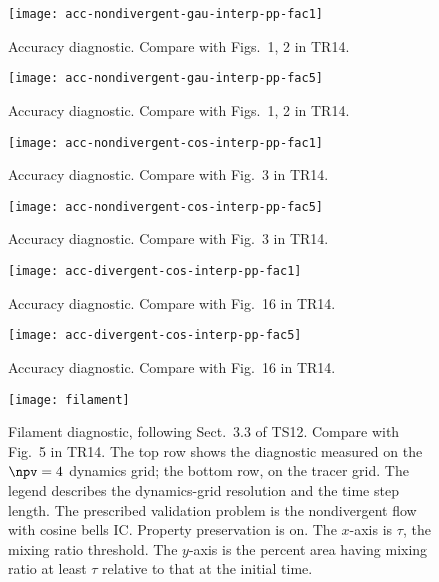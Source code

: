 \begin{figure}[tbh]
  \centering
  \texttt{[image: acc-nondivergent-gau-interp-pp-fac1]}
  \caption{
    Accuracy diagnostic.
    Compare with Figs.~1, 2 in TR14.
  }
  \label{fig:islet-acc-nondiv-gau-a}
\end{figure}
\begin{figure}[tbh]
  \centering
  \texttt{[image: acc-nondivergent-gau-interp-pp-fac5]}
  \caption{
    Accuracy diagnostic.
    Compare with Figs.~1, 2 in TR14.
  }
  \label{fig:islet-acc-nondiv-gau-b}
\end{figure}
\begin{figure}[tbh]
  \centering
  \texttt{[image: acc-nondivergent-cos-interp-pp-fac1]}
  \caption{
    Accuracy diagnostic.
    Compare with Fig.~3 in TR14.
  }
  \label{fig:islet-acc-nondiv-cos-a}
\end{figure}
\begin{figure}[tbh]
  \centering
  \texttt{[image: acc-nondivergent-cos-interp-pp-fac5]}
  \caption{
    Accuracy diagnostic.
    Compare with Fig.~3 in TR14.
  }
  \label{fig:islet-acc-nondiv-cos-b}
\end{figure}
\begin{figure}[tbh]
  \centering
  \texttt{[image: acc-divergent-cos-interp-pp-fac1]}
  \caption{
    Accuracy diagnostic.
    Compare with Fig.~16 in TR14.
  }
  \label{fig:islet-acc-div-cos-a}
\end{figure}
\begin{figure}[tbh]
  \centering
  \texttt{[image: acc-divergent-cos-interp-pp-fac5]}
  \caption{
    Accuracy diagnostic.
    Compare with Fig.~16 in TR14.
  }
  \label{fig:islet-acc-div-cos-b}
\end{figure}

\begin{figure}[tbh]
  \centering
  \texttt{[image: filament]}
  \caption{
    Filament diagnostic, following Sect.~3.3 of TS12.
    Compare with Fig.~5 in TR14.
    The top row shows the diagnostic measured on the $\npv=4$ dynamics grid;
    the bottom row, on the tracer grid.
    The legend describes the dynamics-grid resolution and the time step length.
    The prescribed validation problem is the nondivergent flow with cosine bells IC.
    Property preservation is on.
    The $x$-axis is $\tau$, the mixing ratio threshold.
    The $y$-axis is the percent area having mixing ratio at least $\tau$ relative to that at the initial time.
  }
  \label{fig:filament}
\end{figure}

